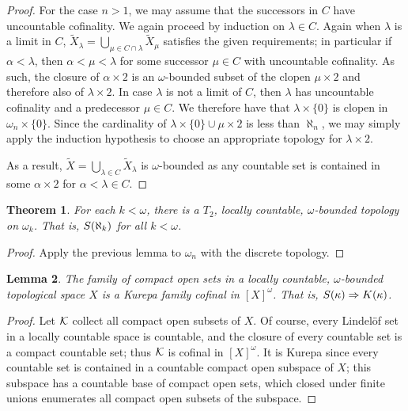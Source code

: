 \documentclass{amsart}
\theoremstyle{plain}
\newtheorem{theorem}{Theorem}
\newtheorem{lemma}[theorem]{Lemma}
\theoremstyle{definition}
\theoremstyle{remark}
\theoremstyle{plain}
\theoremstyle{definition}
\theoremstyle{remark}
\begin{document}
\begin{proof}
    For the case \(n>1\), we may assume that the successors in \(C\)
    have uncountable cofinality.
    We again proceed by induction on \(\lambda\in C\).  Again when
    \(\lambda\) is a limit in \(C\),
    \(
      \tilde X_\lambda
        =
      \bigcup_{\mu\in C\cap\lambda}\tilde X_\mu
    \)
    satisfies the given
    requirements; in particular if \(\alpha<\lambda\), then
    \(\alpha<\mu<\lambda\) for some successor \(\mu\in C\) with uncountable
    cofinality. As such, the closure of \(\alpha\times2\) is
    an \(\omega\)-bounded subset of the clopen \(\mu\times 2\) and
    therefore also of \(\lambda\times 2\).
    In case \(\lambda\) is not a limit of \(C\), then \(\lambda\)
    has uncountable cofinality and a predecessor \(\mu\in C\).
    We therefore have that \(\lambda\times\{0\}\) is clopen
    in \(\omega_n\times \{0\}\). Since the cardinality of
    \(\lambda\times \{0\} \cup \mu\times 2\) is less than \(\aleph_n\),
    we may simply apply the induction hypothesis
    to choose an appropriate topology for \(\lambda\times 2\).

    As a result, \(\tilde X=\bigcup_{\lambda\in C}\tilde X_\lambda\)
    is
    \(\omega\)-bounded as any countable set is contained in some
    \(\alpha\times 2\) for \(\alpha<\lambda\in C\).
  \end{proof}

  \begin{theorem}
    For each \(k< \omega\), there is a \(T_2\), locally countable,
    \(\omega\)-bounded topology on \(\omega_k\). That is, \(S(\aleph_k)\)
    for all \(k<\omega\).
  \end{theorem}

  \begin{proof}
    Apply the previous lemma to \(\omega_n\) with the discrete topology.
  \end{proof}

  \begin{lemma}
    The family of compact open sets in a locally countable, \(\omega\)-bounded
    topological space \(X\)
    is a Kurepa family cofinal in \([X]^\omega\). That is,
    \(S(\kappa) \Rightarrow K(\kappa)\).
  \end{lemma}

  \begin{proof}
    Let \(\mathcal{K}\) collect all compact
    open subsets of \(X\). Of course, every Lindel\"of set in
    a locally countable space is countable, and the closure of every
    countable set is a compact countable set; thus \(\mathcal{K}\)
    is cofinal in \([X]^\omega\).
    It is Kurepa since every countable set is contained in a countable
    compact open subspace of \(X\); this subspace has a countable
    base of compact open sets, which closed under finite unions enumerates
    all compact open subsets of the subspace.
  \end{proof}
\end{document}
